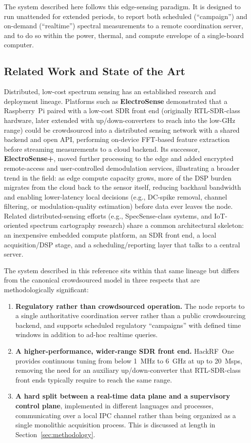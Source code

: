 \documentclass[11pt,a4paper]{article}
\begin{document}
The system described here follows this edge-sensing paradigm. It is designed to run
unattended for extended periods, to report both scheduled (``campaign'') and on-demand
(``realtime'') spectral measurements to a remote coordination server, and to do so within the
power, thermal, and compute envelope of a single-board computer.

\subsection{Related Work and State of the Art}

Distributed, low-cost spectrum sensing has an established research and deployment lineage.
Platforms such as \textbf{ElectroSense} demonstrated that a Raspberry~Pi paired with a
low-cost SDR front end (originally RTL-SDR-class hardware, later extended with
up/down-converters to reach into the low-GHz range) could be crowdsourced into a distributed
sensing network with a shared backend and open API, performing on-device FFT-based feature
extraction before streaming measurements to a cloud backend. Its successor,
\textbf{ElectroSense+}, moved further processing to the edge and added encrypted remote-access
and user-controlled demodulation services, illustrating a broader trend in the field: as edge
compute capacity grows, more of the DSP burden migrates from the cloud back to the sensor
itself, reducing backhaul bandwidth and enabling lower-latency local decisions (e.g.,
DC-spike removal, channel filtering, or modulation-quality estimation) before data ever
leaves the node. Related distributed-sensing efforts (e.g., SpecSense-class systems, and
IoT-oriented spectrum cartography research) share a common architectural skeleton: an
inexpensive embedded compute platform, an SDR front end, a local acquisition/DSP stage, and
a scheduling/reporting layer that talks to a central server.

The system described in this reference sits within that same lineage but differs from the
canonical crowdsourced model in three respects that are methodologically significant:

\begin{enumerate}[leftmargin=1.4em]
    \item \textbf{Regulatory rather than crowdsourced operation.} The node reports to a
    single authoritative coordination server rather than a public crowdsourcing backend,
    and supports scheduled regulatory ``campaigns'' with defined time windows in addition
    to ad-hoc realtime queries.
    \item \textbf{A higher-performance, wider-range SDR front end.} HackRF~One provides
    continuous tuning from below 1~MHz to 6~GHz at up to 20~Msps, removing the need for an
    auxiliary up/down-converter that RTL-SDR-class front ends typically require to reach
    the same range.
    \item \textbf{A hard split between a real-time data plane and a supervisory control
    plane}, implemented in different languages and processes, communicating over a local
    IPC channel rather than being organized as a single monolithic acquisition process.
    This is discussed at length in Section~\ref{sec:methodology}.
\end{enumerate}
\end{document}
